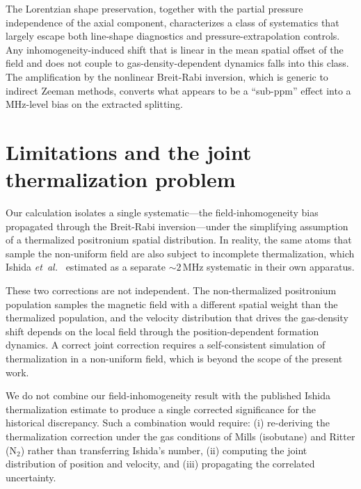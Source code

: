 \documentclass[twocolumn,pra,aps,superscriptaddress,floatfix,10pt]{revtex4-2}
\newcommand{\etal}{\textit{et~al.}}
\begin{document}
The Lorentzian shape preservation, together with the partial pressure independence of the axial component, characterizes a class of systematics that largely escape both line-shape diagnostics and pressure-extrapolation controls. Any inhomogeneity-induced shift that is linear in the mean spatial offset of the field and does not couple to gas-density-dependent dynamics falls into this class. The amplification by the nonlinear Breit-Rabi inversion, which is generic to indirect Zeeman methods, converts what appears to be a ``sub-ppm'' effect into a MHz-level bias on the extracted splitting.

\section{Limitations and the joint thermalization problem}
\label{sec:limitations}

Our calculation isolates a single systematic---the field-inhomogeneity bias propagated through the Breit-Rabi inversion---under the simplifying assumption of a thermalized positronium spatial distribution. In reality, the same atoms that sample the non-uniform field are also subject to incomplete thermalization, which Ishida \etal~\cite{Ishida2014} estimated as a separate $\sim 2$\,MHz systematic in their own apparatus.

These two corrections are not independent. The non-thermalized positronium population samples the magnetic field with a different spatial weight than the thermalized population, and the velocity distribution that drives the gas-density shift depends on the local field through the position-dependent formation dynamics. A correct joint correction requires a self-consistent simulation of thermalization in a non-uniform field, which is beyond the scope of the present work.

We do not combine our field-inhomogeneity result with the published Ishida thermalization estimate to produce a single corrected significance for the historical discrepancy. Such a combination would require: (i) re-deriving the thermalization correction under the gas conditions of Mills (isobutane) and Ritter (N$_2$) rather than transferring Ishida's number, (ii) computing the joint distribution of position and velocity, and (iii) propagating the correlated uncertainty.
\end{document}
